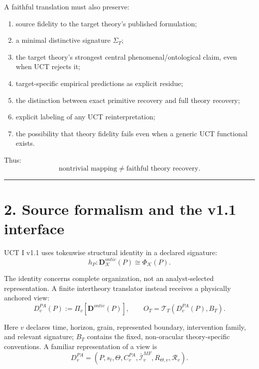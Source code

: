 \documentclass[
  11pt,
  a4paper,
]{article}
\providecommand{\tightlist}{%
  \setlength{\itemsep}{0pt}\setlength{\parskip}{0pt}}
\begin{document}
A faithful translation must also preserve:

\begin{enumerate}
\def\labelenumi{\arabic{enumi}.}
\tightlist
\item
  source fidelity to the target theory's published formulation;
\item
  a minimal distinctive signature \(\Sigma_T\);
\item
  the target theory's strongest central phenomenal/ontological claim,
  even when UCT rejects it;
\item
  target-specific empirical predictions as explicit residue;
\item
  the distinction between exact primitive recovery and full theory
  recovery;
\item
  explicit labeling of any UCT reinterpretation;
\item
  the possibility that theory fidelity fails even when a generic UCT
  functional exists.
\end{enumerate}

Thus:
\nopagebreak[4]
\[
\boxed{
\text{nontrivial mapping}
\neq
\text{faithful theory recovery}.
}
\]

\begin{center}\rule{0.5\linewidth}{0.5pt}\end{center}

\hypertarget{source-formalism-and-the-v1.1-interface}{%
\section{2. Source formalism and the v1.1
interface}\label{source-formalism-and-the-v1.1-interface}}

UCT I v1.1 uses tokenwise structural identity in a declared signature:
\nopagebreak[4]
\[
h_P:\mathbf D^{ontic}_{\mathcal K}(P)\cong\Phi_{\mathcal K}(P).
\]

The identity concerns complete organization, not an analyst-selected
representation. A finite intertheory translator instead receives a
physically anchored view:
\nopagebreak[4]
\[
D^{PA}_v(P):=\Pi_v[\mathbf D^{ontic}(P)],\qquad
O_T=\mathcal T_T(D^{PA}_v(P),B_T).
\]

Here \(v\) declares time, horizon, grain, represented boundary,
intervention family, and relevant signature; \(B_T\) contains the fixed,
non-oracular theory-specific conventions. A familiar representation of a
view is
\nopagebreak[4]
\[
D^{PA}_v=(P,s_t,\Theta,C^{PA}_v,
\bar{\mathcal I}^{MF}_v,R_{\Theta,v},\mathcal R_v).
\]
\end{document}
